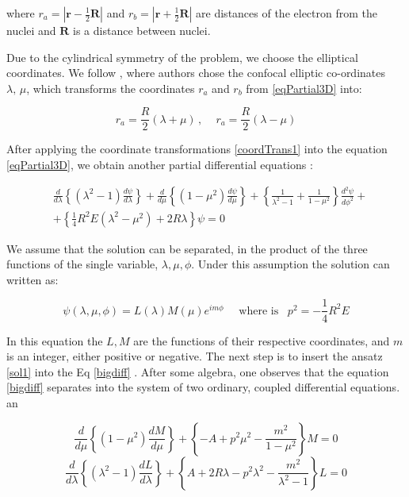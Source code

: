 where $ r_a = \left|\mathbf{r}-\frac{1}{2}\mathbf{R}\right| $ and $ r_b = \left|\mathbf{r}+\frac{1}{2}\mathbf{R}\right| $ are distances of the electron from the nuclei and $ \mathbf{R} $ is a distance between nuclei.

Due to the cylindrical symmetry of the problem, we choose the elliptical coordinates. We follow \cite{Bates1}, where authors chose the confocal elliptic co-ordinates $\lambda,\,\mu $, which transforms the coordinates $ r_a $ and $ r_ b $ from \eqref {eqPartial3D} into:

\begin{equation}\label{coordTrans1}
r_a = \frac{R}{2}(\lambda + \mu)\,,\,\,\,\,\,\,\,r_a = \frac{R}{2}(\lambda - \mu)
\end{equation}

After applying the coordinate transformations \eqref{coordTrans1} into the equation \eqref {eqPartial3D}, we obtain another partial differential equations \cite{Bates1}:

\begin{equation}\label{bigdiff}
\begin{split}
    & \frac{d}{d\lambda}\left\{(\lambda^2-1)\frac{d\psi}{d\lambda}\right\} +\frac{d}{d\mu}\left\{(1-\mu^2)\frac{d\psi}{d\mu}\right\} + \left\{\frac{1}{\lambda^2-1} + \frac{1}{1-\mu^2} \right\}\frac{d^2\psi}{d\phi^2}+ \\[0.5em]
    & + \left\{\frac{1}{4}R^2E(\lambda^2 - \mu^2) + 2R\lambda \right\}\psi = 0
\end{split}
\end{equation}

We assume that the solution can be separated, in the product of the three functions of the single variable, $\lambda,\mu, \phi $. Under this assumption the solution can written as:

\begin{equation}\label{sol1}
\psi(\lambda, \mu, \phi) = L(\lambda)M(\mu)e^{im\phi}\,\,\,\,\,\,\text{ where is }\,\,\,p^2 = -\frac{1}{4}R^2E
\end{equation}

In this equation the $ L, M $ are the functions of their respective coordinates, and $ m $ is an integer, either positive or negative. The next step is to insert the ansatz \eqref{sol1} into the Eq \eqref{bigdiff} .  After some algebra, one observes that the equation \eqref{bigdiff} separates into the system of two ordinary, coupled differential equations.
an

\begin{equation}\label{m3d}
\frac{d}{d\mu}\left\{(1-\mu^2)\frac{dM}{d\mu}\right\} + \left\{-A + p^2\mu^2 -\frac{m^2}{1-\mu^2} \right\}M = 0 
\end{equation}
\begin{equation}\label{l3d}
\frac{d}{d\lambda}\left\{(\lambda^2-1)\frac{dL}{d\lambda}\right\} + \left\{A + 2R\lambda - p^2\lambda^2 -\frac{m^2}{\lambda^2-1} \right\}L = 0 
\end{equation}

